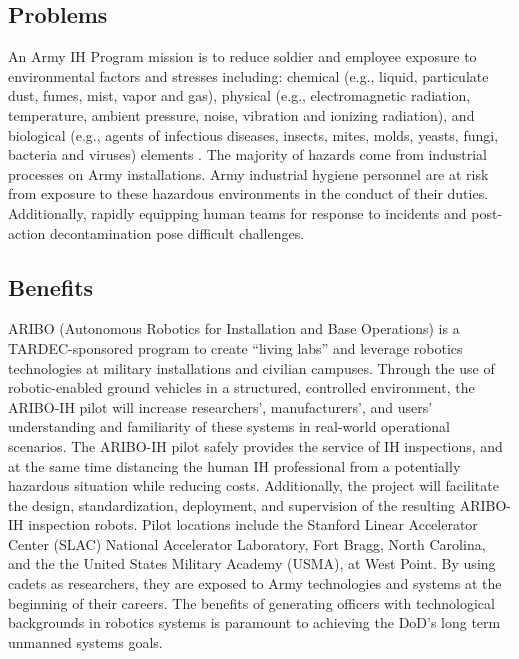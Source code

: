 \subsection{Problems}

An Army IH Program mission is to reduce soldier and employee exposure to environmental factors and stresses including:  chemical (e.g., liquid, particulate dust, fumes, mist, vapor and gas), physical (e.g., electromagnetic radiation, temperature, ambient pressure, noise, vibration and ionizing radiation), and biological (e.g., agents of infectious diseases, insects, mites, molds, yeasts, fungi, bacteria and viruses) elements \cite{ArmymedPAM40503}. The majority of hazards come from industrial processes on Army installations. Army industrial hygiene personnel are at risk from exposure to these hazardous environments in the conduct of their duties. Additionally, rapidly equipping human teams for response to incidents and post-action decontamination pose difficult challenges.  


\subsection{Benefits}

ARIBO (Autonomous Robotics for Installation and Base Operations) is a TARDEC-sponsored program to create ``living labs'' and leverage robotics technologies at military installations and civilian campuses. Through the use of robotic-enabled ground vehicles in a structured, controlled environment, the ARIBO-IH pilot will increase researchers’, manufacturers’, and users’ understanding and familiarity of these systems in real-world operational scenarios. The ARIBO-IH pilot safely provides the service of IH inspections, and at the same time distancing the human IH professional from a potentially hazardous situation while reducing costs. Additionally, the project will facilitate the design, standardization, deployment, and supervision of the resulting ARIBO-IH inspection robots. Pilot locations include the Stanford Linear Accelerator Center (SLAC) National Accelerator Laboratory, Fort Bragg, North Carolina, and the the United States Military Academy (USMA), at West Point. By using cadets as researchers, they are exposed to Army technologies and systems at the beginning of their careers. The benefits of generating officers with technological backgrounds in robotics systems is paramount to achieving the DoD’s long term unmanned systems goals.

